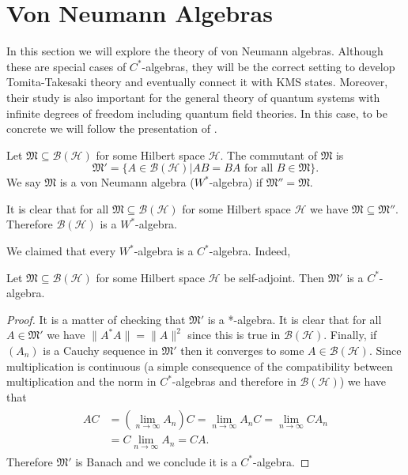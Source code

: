 \section{Von Neumann Algebras}

In this section we will explore the theory of von Neumann algebras. Although these are special cases of $C^*$-algebras, they will be the correct setting to develop Tomita-Takesaki theory and eventually connect it with KMS states. Moreover, their study is also important for the general theory of quantum systems with infinite degrees of freedom including quantum field theories\cite{Haag1996}. In this case, to be concrete we will follow the presentation of \cite{ Evans1998}. 

\begin{definition}
Let $\mathfrak{M}\subseteq \mathcal{B}({\mathcal{H}})$ for some Hilbert space $\mathcal{H}$. The commutant of $\mathfrak{M}$ is
\begin{equation}
\mathfrak{M}'=\{A\in\mathcal{B}(\mathcal{H})|AB=BA\text{ for all } B\in\mathfrak{M}\}.
\end{equation}
We say $\mathfrak{M}$ is a von Neumann algebra ($W^*$-algebra) if $\mathfrak{M}''=\mathfrak{M}$.
\end{definition}

\begin{example}
It is clear that for all $\mathfrak{M}\subseteq\mathcal{B}(\mathcal{H})$ for some Hilbert space $\mathcal{H}$ we have $\mathfrak{M}\subseteq\mathfrak{M}''$. Therefore $\mathcal{B}(\mathcal{H})$ is a $W^*$-algebra.
\end{example}

We claimed that every $W^*$-algebra is a $C^*$-algebra. Indeed,

\begin{theorem}
Let $\mathfrak{M}\subseteq \mathcal{B}({\mathcal{H}})$ for some Hilbert space $\mathcal{H}$ be self-adjoint. Then $\mathfrak{M}'$ is a $C^*$-algebra.
\end{theorem}

\begin{proof}
It is a matter of checking that $\mathfrak{M}'$ is a *-algebra. It is clear that for all $A\in\mathfrak{M}'$ we have $\|A^*A\|=\|A\|^2$ since this is true in $\mathcal{B}(\mathcal{H})$. Finally, if $(A_n)$ is a Cauchy sequence in $\mathfrak{M}'$ then it converges to some $A\in\mathcal{B}(\mathcal{H})$. Since multiplication is continuous (a simple consequence of the compatibility between multiplication and the norm in $C^*$-algebras and therefore in $\mathcal{B}(\mathcal{H})$) we have that
\begin{align}
\begin{split}
AC&=(\lim_{n\rightarrow\infty}A_n)C = \lim_{n\rightarrow\infty}A_nC=\lim_{n\rightarrow\infty}CA_n \\
&= C\lim_{n\rightarrow\infty}A_n=CA.
\end{split}
\end{align}
Therefore $\mathfrak{M}'$ is Banach and we conclude it is a $C^*$-algebra.
\end{proof}

